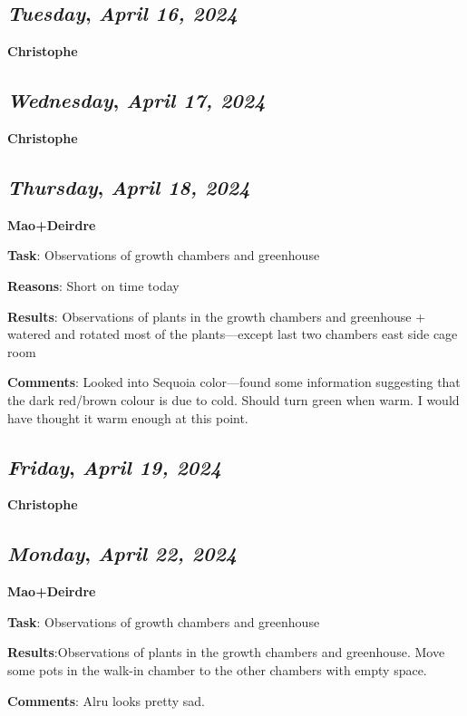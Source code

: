 \def\day{\textit{April 16, 2024}} 
\def\weekday{\textit{Tuesday}}
\subsection*{\weekday, \day}
\textbf {Christophe}

\def\day{\textit{April 17, 2024}}
\def\weekday{\textit{Wednesday}}
\subsection*{\weekday, \day}
\textbf {Christophe}

\def\day{\textit{April 18, 2024}}
\def\weekday{\textit{Thursday}}
\subsection*{\weekday, \day}
\textbf {Mao+Deirdre}
\par 
\textbf {Task}: Observations of growth chambers and greenhouse
\par 
\textbf {Reasons}: Short on time today
\par 
\textbf {Results}: Observations of plants in the growth chambers and greenhouse + watered and rotated most of the plants---except last two chambers east side cage room
\par 
\textbf {Comments}: Looked into Sequoia color---found some information suggesting that the dark red/brown colour is due to cold. Should turn green when warm. I would have thought it warm enough at this point.

\def\day{\textit{April 19, 2024}}
\def\weekday{\textit{Friday}}
\subsection*{\weekday, \day}
\textbf {Christophe}

\def\day{\textit{April 22, 2024}}
\def\weekday{\textit{Monday}}
\subsection*{\weekday, \day}
\textbf {Mao+Deirdre}
\par 
\textbf {Task}: Observations of growth chambers and greenhouse
\par 
\textbf {Results}:Observations of plants in the growth chambers and greenhouse. Move some pots in the walk-in chamber to the other chambers with empty space.
\par 
\textbf {Comments}: Alru looks pretty sad.

